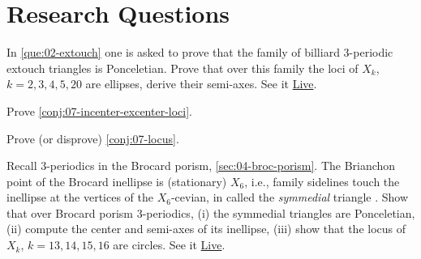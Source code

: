 \section{Research Questions}
\label{sec:07-research}

\begin{question}
In \cref{que:02-extouch} one is asked to prove that the family of billiard 3-periodic extouch triangles is Ponceletian. Prove that over this family the loci of $X_k$, $k=2,3,4,5,20$ are ellipses, derive their semi-axes. See it \href{https://bit.ly/2RdtlvH}{Live}.
\end{question}

\begin{question}
Prove \cref{conj:07-incenter-excenter-loci}.
\end{question}

\begin{question}
Prove (or disprove) \cref{conj:07-locus}.
\end{question}

\begin{question}
Recall 3-periodics in the Brocard porism, \cref{sec:04-broc-porism}. The Brianchon point of the Brocard inellipse is (stationary) $X_6$, i.e., family sidelines touch the inellipse at the vertices of the $X_6$-cevian, in \cite{mw} called the {\em symmedial} triangle \cite{mw}. Show  that over Brocard porism 3-periodics, (i) the symmedial triangles are Ponceletian, (ii) compute the center and semi-axes of its inellipse, (iii) show that the locus of $X_k$, $k=13,14,15,16$ are circles. See it \href{https://bit.ly/3hXos4E}{Live}.
\end{question}